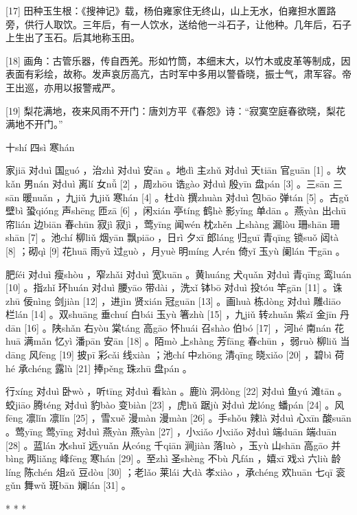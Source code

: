 \documentclass[12pt,UTF8]{ctexbook}
\begin{document}
[17] 田种玉生根：《搜神记》载，杨伯雍家住无终山，山上无水，伯雍担水置路旁，供行人取饮。三年后，有一人饮水，送给他一斗石子，让他种。几年后，石子上生出了玉石。后其地称玉田。

[18] 画角：古管乐器，传自西羌。形如竹筒，本细末大，以竹木或皮革等制成，因表面有彩绘，故称。发声哀厉高亢，古时军中多用以警昏晓，振士气，肃军容。帝王出巡，亦用以报警戒严。

[19] 梨花满地，夜来风雨不开门：唐刘方平《春怨》诗：“寂寞空庭春欲晓，梨花满地不开门。”





十shí 四sì 寒hán


家jiā 对duì 国guó ，治zhì 对duì 安ān 。地dì 主zhǔ 对duì 天tiān 官guān [1] 。坎kǎn 男nán 对duì 离lí 女nǚ [2] ，周zhōu 诰gào 对duì 殷yīn 盘pán [3] 。三sān 三sān 暖nuǎn ，九jiǔ 九jiǔ 寒hán [4] 。杜dù 撰zhuàn 对duì 包bāo 弹tán [5] 。古gǔ 壁bì 蛩qióng 声shēng 匝zā [6] ，闲xián 亭tíng 鹤hè 影yǐng 单dān 。燕yàn 出chū 帘lián 边biān 春chūn 寂jì 寂jì ，莺yīng 闻wén 枕zhěn 上shàng 漏lòu 珊shān 珊shān [7] 。池chí 柳liǔ 烟yān 飘piāo ，日rì 夕xī 郎láng 归guī 青qīng 锁suǒ 闼tà [8] ；砌qì [9] 花huā 雨yǔ 过guò ，月yuè 明míng 人rén 倚yǐ 玉yù 阑lán 干gān 。

肥féi 对duì 瘦shòu ，窄zhǎi 对duì 宽kuān 。黄huáng 犬quǎn 对duì 青qīng 鸾luán [10] 。指zhǐ 环huán 对duì 腰yāo 带dài ，洗xǐ 钵bō 对duì 投tóu 竿gān [11] 。诛zhū 佞nìng 剑jiàn [12] ，进jìn 贤xián 冠guān [13] 。画huà 栋dòng 对duì 雕diāo 栏lán [14] 。双shuāng 垂chuí 白bái 玉yù 箸zhù [15] ，九jiǔ 转zhuǎn 紫zǐ 金jīn 丹dān [16] 。陕shǎn 右yòu 棠táng 高gāo 怀huái 召shào 伯bó [17] ，河hé 南nán 花huā 满mǎn 忆yì 潘pān 安ān [18] 。陌mò 上shàng 芳fāng 春chūn ，弱ruò 柳liǔ 当dāng 风fēng [19] 披pī 彩cǎi 线xiàn ；池chí 中zhōng 清qīng 晓xiǎo [20] ，碧bì 荷hé 承chéng 露lù [21] 捧pěng 珠zhū 盘pán 。

行xíng 对duì 卧wò ，听tīng 对duì 看kàn 。鹿lù 洞dòng [22] 对duì 鱼yú 滩tān 。蛟jiāo 腾téng 对duì 豹bào 变biàn [23] ，虎hǔ 踞jù 对duì 龙lóng 蟠pán [24] 。风fēng 凛lǐn 凛lǐn [25] ，雪xuě 漫màn 漫màn [26] 。手shǒu 辣là 对duì 心xīn 酸suān 。莺yīng 莺yīng 对duì 燕yàn 燕yàn [27] ，小xiǎo 小xiǎo 对duì 端duān 端duān [28] 。蓝lán 水shuǐ 远yuǎn 从cóng 千qiān 涧jiàn 落luò ，玉yù 山shān 高gāo 并bìng 两liǎng 峰fēng 寒hán [29] 。至zhì 圣shèng 不bù 凡fán ，嬉xī 戏xì 六liù 龄líng 陈chén 俎zǔ 豆dòu [30] ；老lǎo 莱lái 大dà 孝xiào ，承chéng 欢huān 七qī 衮gǔn 舞wǔ 斑bān 斓lán [31] 。



* * *
\end{document}
